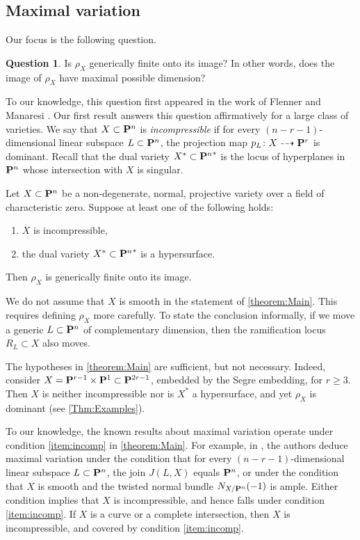\documentclass[11pt,reqno]{amsart}
\theoremstyle{plain}
\theoremstyle{definition}
\newtheorem{question}[theorem]{Question}
\theoremstyle{remark}
\numberwithin{equation}{section}
\numberwithin{equation}{section}
\begin{document}
\subsection{Maximal variation}
Our focus is the following question.
\begin{question}\label{q:maxvar}
  Is $\rho_{X}$ generically finite onto its image? In other words, does the image of $\rho_X$ have maximal possible dimension?
\end{question}

To our knowledge, this question first appeared in the work of Flenner and Manaresi \cite{MANAFlenn:}.
Our first result answers this question affirmatively for a large class of varieties.
We say that $X \subset \P^n$ is \emph{incompressible} if for every $(n-r-1)$-dimensional linear subspace $L \subset \P^n$, the projection map $p_L \from X \dashrightarrow \P^r$ is dominant.
Recall that the dual variety $X^* \subset {\P^n}^*$ is the locus of hyperplanes in $\P^n$ whose intersection with $X$ is singular.
\begin{maintheorem}\label{theorem:Main}
  Let $X \subset \P^n$ be a non-degenerate, normal, projective variety over a field of characteristic zero.
  Suppose at least one of the following holds:
  \begin{enumerate}
  \item\label{item:incomp} $X$ is incompressible, 
  \item\label{item:dual} the dual variety $X^* \subset {\P^n}^*$ is a hypersurface.
  \end{enumerate}
  Then $\rho_{X}$ is generically finite onto its image.
\end{maintheorem} 
We do not assume that $X$ is smooth in the statement of \autoref{theorem:Main}.
This requires defining $\rho_X$ more carefully.
To state the conclusion informally, if we move a generic $L \subset \P^n$ of complementary dimension, then the ramification locus $R_L \subset X$ also moves.

The hypotheses in \autoref{theorem:Main} are sufficient, but not necessary.
Indeed, consider $X = \P^{r-1} \times \P^1 \subset \P^{2r-1}$, embedded by the Segre embedding, for $r \geq 3$.
Then $X$ is neither incompressible nor is $X^*$ a hypersurface, and yet $\rho_X$ is dominant (see \autoref{Thm:Examples}).

To our knowledge, the known results about maximal variation operate under condition \eqref{item:incomp} in \autoref{theorem:Main}.
For example, in \cite{MANAFlenn:}, the authors deduce maximal variation under the condition that for every $(n-r-1)$-dimensional linear subspace $L \subset \P^n$, the join $J(L, X)$ equals $\P^n$, or under the condition that $X$ is smooth and the twisted normal bundle $N_{X/\P^n}(-1)$ is ample.
Either condition implies that $X$ is incompressible, and hence falls under condition \eqref{item:incomp}.
If $X$ is a curve or a complete intersection, then $X$ is incompressible, and covered by condition \eqref{item:incomp}.
\end{document}
